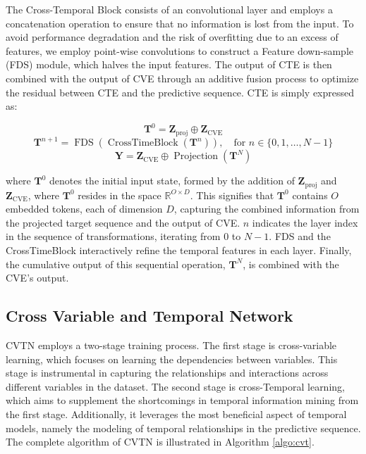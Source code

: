 The Cross-Temporal Block consists of an convolutional layer and employs a concatenation operation to ensure that no information is lost from the input. To avoid performance degradation and the risk of overfitting due to an excess of features, we employ point-wise convolutions to construct a Feature down-sample (FDS) module, which halves the input features. The output of CTE is then combined with the output of CVE through an additive fusion process to optimize the residual between CTE and the predictive sequence. CTE is simply expressed as:

\begin{equation}
  \mathbf{T}^0 = \mathbf{Z}_{\text{proj}} \oplus \mathbf{Z}_{\text{CVE}}
\end{equation}
\begin{equation}
  \mathbf{T}^{n + 1} = \operatorname{FDS}(\operatorname{CrossTimeBlock}(\mathbf{T}^{n})), \quad \text{for } n \in \{0, 1, \ldots, N - 1\}
\end{equation}
\begin{equation}
  \mathbf{Y} = \mathbf{Z}_{\text{CVE}} \oplus \operatorname{Projection}(\mathbf{T}^{N})
\end{equation}

where \( \mathbf{T}^0 \) denotes the initial input state, formed by the addition of \( \mathbf{Z}_{\text{proj}} \) and \( \mathbf{Z}_{\text{CVE}} \), where \( \mathbf{T}^0 \) resides in the space \( \mathbb{R}^{O \times D} \). This signifies that \( \mathbf{T}^0 \) contains \( O \) embedded tokens, each of dimension \( D \), capturing the combined information from the projected target sequence and the output of CVE. \( n \) indicates the layer index in the sequence of transformations, iterating from 0 to \( N - 1 \). FDS and the CrossTimeBlock interactively refine the temporal features in each layer. Finally, the cumulative output of this sequential operation, \( \mathbf{T}^{N} \), is combined with the CVE's output.

\subsection{Cross Variable and Temporal Network}
CVTN employs a two-stage training process. The first stage is cross-variable learning, which focuses on learning the dependencies between variables. This stage is instrumental in capturing the relationships and interactions across different variables in the dataset. The second stage is cross-Temporal learning, which aims to supplement the shortcomings in temporal information mining from the first stage. Additionally, it leverages the most beneficial aspect of temporal models, namely the modeling of temporal relationships in the predictive sequence. The complete algorithm of CVTN is illustrated in Algorithm  \ref{algo:cvt}.

